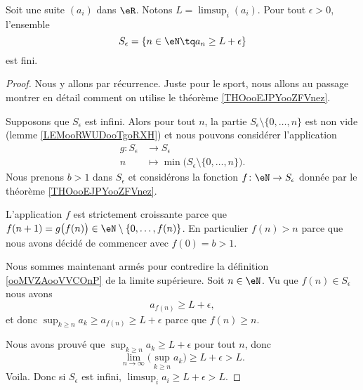 \begin{lemma}       \label{LEMooHGJVooCbgOEK}
	Soit une suite \( (a_i)\) dans \( \eR\). Notons \( L= \limsup_i(a_i)\).
	Pour tout \( \epsilon>0\), l'ensemble
	\begin{equation}
		S_{\epsilon}=\{ n\in \eN\tq a_n\geq L+\epsilon \}
	\end{equation}
	est fini.
\end{lemma}

\begin{proof}
	Nous y allons par récurrence. Juste pour le sport, nous allons au passage montrer en détail comment on utilise le théorème \ref{THOooEJPYooZFVnez}.


	Supposons que \( S_{\epsilon}\) est infini. Alors pour tout \( n\), la partie \( S_{\epsilon}\setminus\{ 0,\ldots, n \}\) est non vide (lemme \ref{LEMooRWUDooTgoRXH}) et nous pouvons considérer l'application
	\begin{equation}
		\begin{aligned}
			g\colon S_{\epsilon} & \to S_{\epsilon}                                                \\
			n                    & \mapsto \min\big( S_{\epsilon}\setminus\{ 0,\ldots, n \} \big).
		\end{aligned}
	\end{equation}
	Nous prenons \( b>1\) dans \( S_{\epsilon}\) et considérons la fonction \( f\colon \eN\to S_{\epsilon}\) donnée par le théorème \ref{THOooEJPYooZFVnez}.

	L'application \( f\) est strictement croissante parce que \( f(n+1)=g\big( f(n) \big)\in \eN\setminus\{ 0,\ldots, f(n) \}\). En particulier \( f(n)>n\) parce que nous avons décidé de commencer avec \( f(0)=b>1\).

	Nous sommes maintenant armés pour contredire la définition \ref{ooMVZAooVVCOnP} de la limite supérieure. Soit \( n\in \eN\). Vu que \( f(n)\in S_{\epsilon}\) nous avons
	\begin{equation}
		a_{f(n)}\geq L+\epsilon,
	\end{equation}
	et donc \( \sup_{k\geq n}a_k\geq a_{f(n)}\geq L+\epsilon\) parce que \( f(n)\geq n\).

	Nous avons prouvé que \( \sup_{k\geq n}a_k\geq L+\epsilon\) pour tout \( n\), donc
	\begin{equation}
		\lim_{n\to \infty} \big( \sup_{k\geq n}a_k \big)\geq L+\epsilon>L.
	\end{equation}
	Voila. Donc si \( S_{\epsilon}\) est infini, \( \limsup_ia_i\geq L+\epsilon>L\).
\end{proof}

